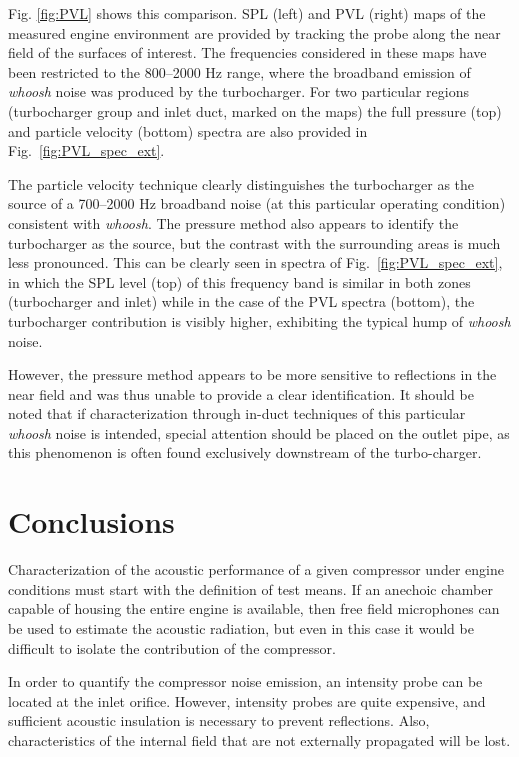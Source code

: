 Fig. \ref{fig:PVL} shows this comparison. SPL (left) and PVL (right) maps of the measured engine environment are provided by tracking the probe along the near field of the surfaces of interest. The frequencies considered in these maps have been restricted to the 800--2000 Hz range, where the broadband emission of \emph{whoosh} noise was produced by the turbocharger. For two particular regions (turbocharger group and inlet duct, marked on the maps) the full pressure (top) and particle velocity (bottom) spectra are also provided in Fig.~\ref{fig:PVL_spec_ext}.

The particle velocity technique clearly distinguishes the turbocharger as the source of a 700--2000 Hz broadband noise (at this particular operating condition) consistent with \emph{whoosh}. The pressure method also appears to identify the turbocharger as the source, but the contrast with the surrounding areas is much less pronounced. This can be clearly seen in spectra of Fig.~\ref{fig:PVL_spec_ext}, in which the SPL level (top) of this frequency band is similar in both zones (turbocharger and inlet) while in the case of the PVL spectra (bottom), the turbocharger contribution is visibly higher, exhibiting the typical hump of \emph{whoosh} noise.

However, the pressure method appears to be more sensitive to reflections in the near field and was thus unable to provide a clear identification. It should be noted that if characterization through in-duct techniques of this particular \emph{whoosh} noise is intended, special attention should be placed on the outlet pipe, as this phenomenon is often found exclusively downstream of the turbo-charger.

\section{Conclusions}
\label{sec:motor_conclusions}

Characterization of the acoustic performance of a given compressor under engine conditions must start with the definition of test means. If an anechoic chamber capable of housing the entire engine is available, then free field microphones can be used to estimate the acoustic radiation, but even in this case it would be difficult to isolate the contribution of the compressor.

In order to quantify the compressor noise emission, an intensity probe can be located at the inlet orifice. However, intensity probes are quite expensive, and sufficient acoustic insulation is necessary to prevent reflections. Also, characteristics of the internal field that are not externally propagated will be lost.

